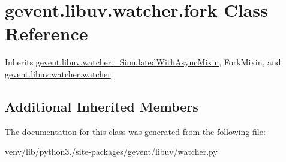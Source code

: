 \hypertarget{classgevent_1_1libuv_1_1watcher_1_1fork}{}\section{gevent.\+libuv.\+watcher.\+fork Class Reference}
\label{classgevent_1_1libuv_1_1watcher_1_1fork}


Inherits \hyperlink{classgevent_1_1libuv_1_1watcher_1_1___simulated_with_async_mixin}{gevent.\+libuv.\+watcher.\+\_\+\+Simulated\+With\+Async\+Mixin}, Fork\+Mixin, and \hyperlink{classgevent_1_1libuv_1_1watcher_1_1watcher}{gevent.\+libuv.\+watcher.\+watcher}.

\subsection*{Additional Inherited Members}


The documentation for this class was generated from the following file\+:\begin{DoxyCompactItemize}
\item 
venv/lib/python3./site-\/packages/gevent/libuv/watcher.\+py\end{DoxyCompactItemize}
